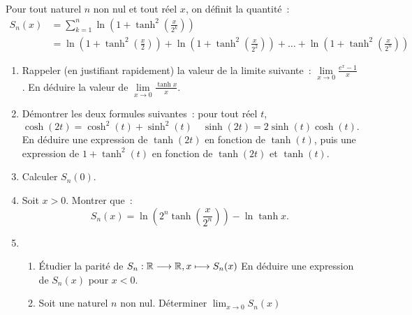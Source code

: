 \begin{exercice}
    Pour tout naturel \(n\) non nul et tout réel \(x\), on définit la quantité~:
    \begin{align}
        S_n(x) &= \sum_{k=1}^n \ln\left(1+ \tanh^2\left(\frac{x}{2^k}\right)\right) \\
               &= \ln\left(1+ \tanh^2\left(\frac{x}{2}\right)\right) + \ln\left(1+ \tanh^2\left(\frac{x}{2^2}\right)\right) + \ldots + \ln\left(1+ \tanh^2\left(\frac{x}{2^n}\right)\right) 
    \end{align}
    \begin{enumerate}
        \item Rappeler (en justifiant rapidement) la valeur de la limite suivante~: \(\lim\limits_{x\to 0} \frac{e^x-1}{x}\). En déduire la valeur de \(\lim\limits_{x\to 0} \frac{\tanh x}{x}\).
        \item Démontrer les deux formules suivantes~: pour tout réel \(t\),
            \begin{equation}
                \cosh(2t) = \cosh^2(t) + \sinh^2(t) \quad \sinh(2t) = 2\sinh(t)\cosh(t).
            \end{equation}
            En déduire une expression de \(\tanh(2t)\) en fonction de \(\tanh(t)\), puis une expression de \(1+\tanh^2(t)\) en fonction de \(\tanh(2t)\) et \(\tanh(t)\).
        \item Calculer \(S_n(0)\).
        \item Soit \(x >0\). Montrer que~:
            \begin{equation}
                S_n(x) = \ln\left(2^n \tanh\left(\frac{x}{2^n}\right)\right) - \ln \tanh x.
            \end{equation}
        \item \begin{enumerate}
                \item Étudier la parité de \(S_n:\mathbb{R} \longrightarrow \mathbb{R}, x \longmapsto S_n(x)\) En déduire une expression de \(S_n(x)\) pour \(x<0\).
                \item Soit une naturel \(n\) non nul. Déterminer \(\lim_{x\to 0} S_n(x)\)
            \end{enumerate}
    \end{enumerate}
\end{exercice}
